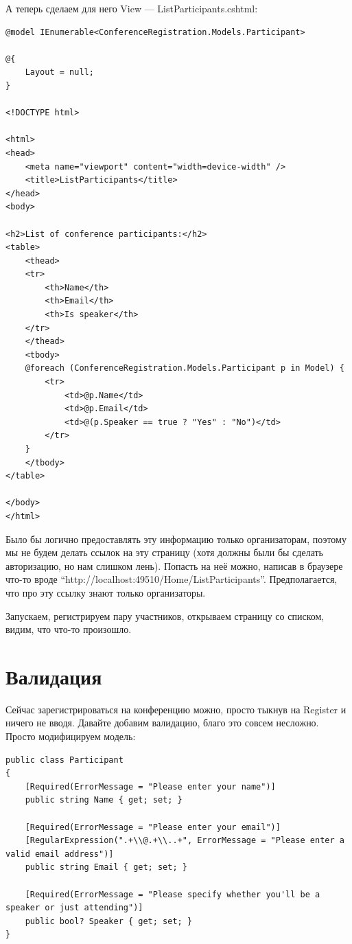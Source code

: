 \documentclass[a5paper]{article}
\begin{document}
А теперь сделаем для него View --- ListParticipants.cshtml:

\begin{verbatim}
@model IEnumerable<ConferenceRegistration.Models.Participant>

@{
    Layout = null;
}

<!DOCTYPE html>

<html>
<head>
    <meta name="viewport" content="width=device-width" />
    <title>ListParticipants</title>
</head>
<body>

<h2>List of conference participants:</h2>
<table>
    <thead>
    <tr>
        <th>Name</th>
        <th>Email</th>
        <th>Is speaker</th>
    </tr>
    </thead>
    <tbody>
    @foreach (ConferenceRegistration.Models.Participant p in Model) {
        <tr>
            <td>@p.Name</td>
            <td>@p.Email</td>
            <td>@(p.Speaker == true ? "Yes" : "No")</td>
        </tr>
    }
    </tbody>
</table>

</body>
</html>
\end{verbatim}

Было бы логично предоставлять эту информацию только организаторам, поэтому мы не будем делать ссылок на эту страницу (хотя должны были бы сделать авторизацию, но нам слишком лень). Попасть на неё можно, написав в браузере что-то вроде ``http://localhost:49510/Home/ListParticipants''.
Предполагается, что про эту ссылку знают только организаторы.

Запускаем, регистрируем пару участников, открываем страницу со списком, видим, что что-то произошло.

\section{Валидация}

Сейчас зарегистрироваться на конференцию можно, просто тыкнув на Register и ничего не вводя. Давайте добавим валидацию, благо это совсем несложно. Просто модифицируем модель:

\begin{verbatim}
public class Participant
{
    [Required(ErrorMessage = "Please enter your name")]
    public string Name { get; set; }

    [Required(ErrorMessage = "Please enter your email")]
    [RegularExpression(".+\\@.+\\..+", ErrorMessage = "Please enter a valid email address")]
    public string Email { get; set; }

    [Required(ErrorMessage = "Please specify whether you'll be a speaker or just attending")]
    public bool? Speaker { get; set; }
}
\end{verbatim}
\end{document}
